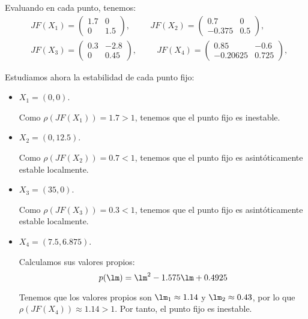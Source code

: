 \begin{ejercicio}
\begin{enumerate}
    Evaluando en cada punto, tenemos:
    \begin{align*}
        &JF(X_1) = \begin{pmatrix}
            1.7 & 0\\
            0 & 1.5
        \end{pmatrix},\hspace{1cm}
        JF(X_2) = \begin{pmatrix}
            0.7 & 0\\
            -0.375 & 0.5
        \end{pmatrix},\\
        &JF(X_3) = \begin{pmatrix}
            0.3 & -2.8\\
            0 & 0.45
        \end{pmatrix},\hspace{1cm}
        JF(X_4) = \begin{pmatrix}
            0.85 & -0.6\\
            -0.20625 & 0.725
        \end{pmatrix},
    \end{align*}

    Estudiamos ahora la estabilidad de cada punto fijo:
    \begin{itemize}
        \item $X_1=(0,0)$.
        
        Como $\rho(JF(X_1)) = 1.7>1$, tenemos que el punto fijo es inestable.

        \item $X_2=(0,12.5)$.
        
        Como $\rho(JF(X_2)) = 0.7<1$, tenemos que el punto fijo es asintóticamente estable localmente.

        \item $X_3=(35,0)$.
        
        Como $\rho(JF(X_3)) = 0.3<1$, tenemos que el punto fijo es asintóticamente estable localmente.

        \item $X_4=(7.5,6.875)$.
        
        Calculamos sus valores propios:
        \begin{equation*}
            p(\lm) = \lm^2-1.575\lm +0.4925
        \end{equation*}

        Tenemos que los valores propios son $\lm_1\approx 1.14$ y $\lm_2\approx 0.43$,
        por lo que $\rho(JF(X_4)) \approx 1.14>1$. Por tanto, el punto fijo es inestable.
    \end{itemize}


\end{enumerate}
\end{ejercicio}
